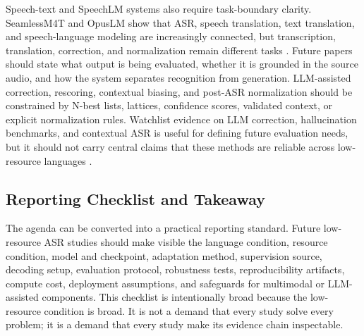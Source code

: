 \documentclass[pdflatex,sn-basic,iicol]{sn-jnl}
\theoremstyle{thmstyleone}
\theoremstyle{thmstyletwo}
\theoremstyle{thmstylethree}
\begin{document}
Speech-text and SpeechLM systems also require task-boundary clarity. SeamlessM4T and OpusLM show that ASR, speech translation, text translation, and speech-language modeling are increasingly connected, but transcription, translation, correction, and normalization remain different tasks \citep{seamless2025_joint_speech_text_mt,tian25b_interspeech}. Future papers should state what output is being evaluated, whether it is grounded in the source audio, and how the system separates recognition from generation. LLM-assisted correction, rescoring, contextual biasing, and post-ASR normalization should be constrained by N-best lists, lattices, confidence scores, validated context, or explicit normalization rules. Watchlist evidence on LLM correction, hallucination benchmarks, and contextual ASR is useful for defining future evaluation needs, but it should not carry central claims that these methods are reliable across low-resource languages \citep{ma2024asrerrorcorrection,koudounas2025shallow,wang2025contextasrbench}.

\subsection{Reporting Checklist and Takeaway}

The agenda can be converted into a practical reporting standard. Future low-resource ASR studies should make visible the language condition, resource condition, model and checkpoint, adaptation method, supervision source, decoding setup, evaluation protocol, robustness tests, reproducibility artifacts, compute cost, deployment assumptions, and safeguards for multimodal or LLM-assisted components. This checklist is intentionally broad because the low-resource condition is broad. It is not a demand that every study solve every problem; it is a demand that every study make its evidence chain inspectable.
\end{document}
